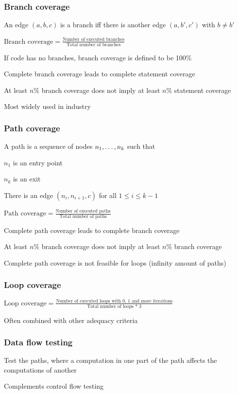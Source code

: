 \subsubsection{Branch coverage}
\enumstart
	\item An edge $(a,b,c)$ is a branch iff there is another edge $(a,b',c')$ with $b \ne b'$
	\item $\text{Branch coverage} = \frac{\text{Number of executed branches}}{\text{Total number of branches}}$
	\item If code has no branches, branch coverage is defined to be 100\%
	\item Complete branch coverage leads to complete statement coverage
	\item At least $n$\% branch coverage does not imply at least $n$\% statement coverage
	\item Most widely used in industry
\enumend

\subsubsection{Path coverage}
\enumstart
	\item A path is a sequence of nodes $n_1, \mathellipsis, n_k$ such that
	\enumstart
		\item $n_1$ is an entry point
		\item $n_k$ is an exit
		\item There is an edge $(n_i, n_{i+1}, c)$ for all $1 \le i \le k-1$
	\enumend
	\item $\text{Path coverage} = \frac{\text{Number of executed paths}}{\text{Total number of paths}}$
	\item Complete path coverage leads to complete branch coverage
	\item At least $n$\% branch coverage does not imply at least $n$\% branch coverage
	\item Complete path coverage is not feasible for loops (infinity amount of paths)
\enumend

\subsubsection{Loop coverage}
\enumstart
	\item $\text{Loop coverage} = \frac{\text{Number of executed loops with 0, 1 and more iterations}}{\text{Total number of loops * 3}}$
	\item Often combined with other adequacy criteria
\enumend

\subsubsection{Data flow testing}
\enumstart
	\item Test the paths, where a computation in one part of the path affects the computations of another
	\item Complements control flow testing
\enumend

